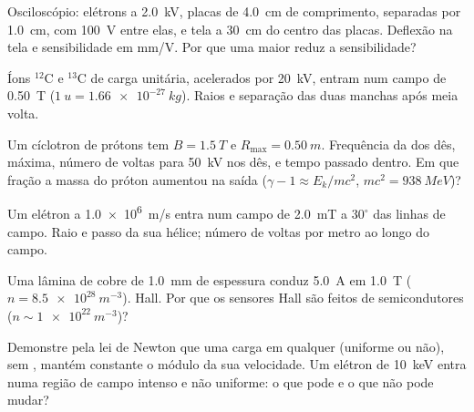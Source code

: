 \begin{exercise}[$\star\star$]\label{exo:b1:charged-particles:5}
Osciloscópio: elétrons a \qty{2.0}{kV}, placas de \qty{4.0}{cm} de comprimento,
separadas por \qty{1.0}{cm}, com \qty{100}{V} entre elas, e tela a \qty{30}{cm} do
centro das placas. Deflexão na tela e sensibilidade em mm/V.
Por que uma  maior reduz a sensibilidade?
\end{exercise}

\begin{exercise}[$\star\star$]\label{exo:b1:charged-particles:6}
Íons $^{12}$C e $^{13}$C de carga unitária, acelerados por
\qty{20}{kV}, entram num campo de \qty{0.50}{T} ($\qty{1}{u} = \qty{1.66e-27}{kg}$).
Raios e separação das duas manchas após meia volta.
\end{exercise}

\begin{exercise}[$\star\star$]\label{exo:b1:charged-particles:7}
Um cíclotron de prótons tem $B = \qty{1.5}{T}$ e $R_{\max} = \qty{0.50}{m}$.
Frequência da  dos dês,  máxima, número de voltas
para \qty{50}{kV} nos dês, e tempo passado dentro. Em que fração
a massa do próton aumentou na saída ($\gamma - 1 \approx E_k/mc^2$,
$mc^2 = \qty{938}{MeV}$)?
\end{exercise}

\begin{exercise}[$\star\star$]\label{exo:b1:charged-particles:8}
Um elétron a \qty{1.0e6}{m/s} entra num campo de \qty{2.0}{mT} a $30^\circ$
das linhas de campo. Raio e passo da sua hélice; número de voltas por
metro ao longo do campo.
\end{exercise}

\begin{exercise}[$\star\star$]\label{exo:b1:charged-particles:9}
Uma lâmina de cobre de \qty{1.0}{mm} de espessura conduz \qty{5.0}{A} em \qty{1.0}{T}
($n = \qty{8.5e28}{m^{-3}}$).  Hall. Por que os sensores Hall são feitos de
semicondutores ($n \sim \qty{1e22}{m^{-3}}$)?
\end{exercise}

\begin{exercise}[$\star\star\star$]\label{exo:b1:charged-particles:10}
Demonstre pela lei de Newton que uma carga em qualquer  (uniforme ou
não), sem , mantém constante o módulo da sua velocidade. Um
elétron de \qty{10}{keV} entra numa região de campo intenso e não uniforme: o que pode e
o que não pode mudar?
\end{exercise}

